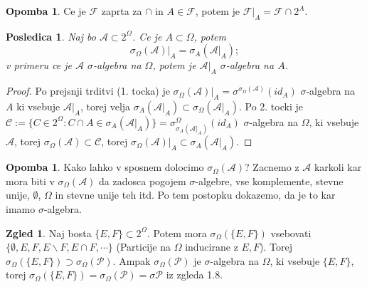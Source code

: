 \documentclass[a4paper,12pt]{article}
\theoremstyle{definition} %
\newtheorem{zgled}[definicija]{Zgled}
\newtheorem{opomba}[definicija]{Opomba}
\theoremstyle{plain} %
\newtheorem{posledica}[definicija]{Posledica}
\newcommand{\F}{\mathcal{F}}
\newcommand{\A}{\mathcal{A}}
\begin{document}
            \begin{opomba}
                Ce je $\F$ zaprta za $\cap$ in $A \in \F$, potem je $\F|_A = \F \cap 2^A$.
            \end{opomba}

            \begin{posledica}
                Naj bo $\A \subset 2^\Omega$. Ce je $A \subset \Omega$, potem $$ \sigma_\Omega(\A)|_A = \sigma_A(\A|_A);$$ v primeru ce je $\A$ $\sigma$-algebra na $\Omega$, potem je $\A|_A$ $\sigma$-algebra na $A$.
            \end{posledica}

            \begin{proof}
                Po prejsnji trditvi (1. tocka) je $\sigma_\Omega(\A)|_A = \sigma^{\sigma_\Omega(\A)}(id_A)$ $\sigma$-algebra na $A$ ki vsebuje $\A|_A$, torej velja $\sigma_A(\A|_A) \subset \sigma_\Omega(\A|_A).$ Po 2. tocki je $\mathcal{C} := \{ C \in 2^\Omega: C \cap A \in \sigma_A(\A|_A)\} = \sigma_{\sigma_A(\A|_A)}^\Omega(id_A)$ $\sigma$-algebra na $\Omega$, ki vsebuje $\A$, torej $\sigma_\Omega(\A) \subset \mathcal{C}$, torej $\sigma_\Omega(\A)|_A \subset \sigma_A(\A|_A).$

            \end{proof}


            \begin{opomba}
                Kako lahko v sposnem dolocimo $\sigma_\Omega(\A)$? Zacnemo z $\A$ karkoli kar mora biti v $\sigma_\Omega(\A)$ da zadosca pogojem $\sigma$-algebre, vse komplemente, stevne unije, $\emptyset$, $\Omega$ in stevne unije teh itd. Po tem postopku dokazemo, da je to kar imamo $\sigma$-algebra.
            \end{opomba}

            \begin{zgled}
                Naj bosta $\{E, F\} \subset 2^\Omega.$ Potem mora $\sigma_\Omega(\{E, F\})$ vsebovati $\{\emptyset, E, F, E\backslash F, E \cap F, \cdots\}$ (Particije na $\Omega$ inducirane z $E, F$). Torej $\sigma_\Omega(\{E, F\}) \supset \sigma_{\Omega}(\mathcal{P})$. Ampak $\sigma_{\Omega}(\mathcal{P})$ je $\sigma$-algebra na $\Omega$, ki vsebuje $\{E, F\}$, torej $\sigma_\Omega(\{E, F\}) = \sigma_{\Omega}(\mathcal{P}) = \sigma\mathcal{P}$ iz zgleda 1.8.
            \end{zgled}
\end{document}
